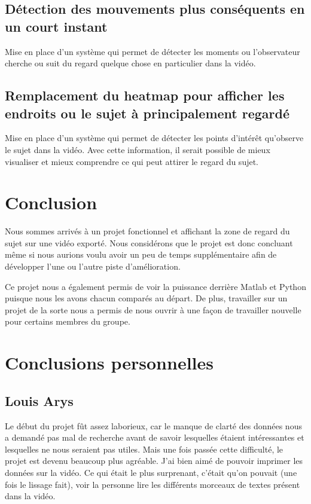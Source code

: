 \documentclass[12pt]{article}
\begin{document}
\subsection{Détection des mouvements plus conséquents en un court instant}

Mise en place d'un système qui permet de détecter les moments ou l'observateur cherche ou suit du regard quelque chose en particulier dans la vidéo.

\subsection{Remplacement du heatmap pour afficher les endroits ou le sujet à principalement regardé}

Mise en place d'un système qui permet de détecter les points d'intérêt qu'observe le sujet dans la vidéo.
Avec cette information, il serait possible de mieux visualiser et mieux comprendre ce qui peut attirer le regard du sujet.

\newpage

\section{Conclusion}

Nous sommes arrivés à un projet fonctionnel et affichant la zone de regard du sujet sur une vidéo exporté.
Nous considérons que le projet est donc concluant même si nous aurions voulu avoir un peu de temps supplémentaire afin de développer l'une ou l'autre piste d'amélioration.

Ce projet nous a également permis de voir la puissance derrière Matlab et Python puisque nous les avons chacun comparés au départ.
De plus, travailler sur un projet de la sorte nous a permis de nous ouvrir à une façon de travailler nouvelle pour certains membres du groupe.

\section{Conclusions personnelles}

\subsection{Louis Arys}

Le début du projet fût assez laborieux, car le manque de clarté des données nous a demandé pas mal de recherche avant de savoir lesquelles étaient intéressantes et lesquelles ne nous seraient pas utiles. Mais une fois passée cette difficulté, le projet est devenu beaucoup plus agréable. J'ai bien aimé de pouvoir imprimer les données sur la vidéo. Ce qui était le plus surprenant, c'était qu'on pouvait (une fois le  lissage fait), voir la personne lire les différents morceaux de textes présent dans la vidéo.
\end{document}
